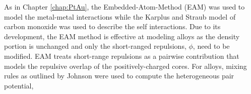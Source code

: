 %
%
As in Chapter \ref{chap:PtAu}, the Embedded-Atom-Method (EAM) was used to model
the metal-metal interactions while the Karplus and Straub model of carbon
monoxide was used to describe the  self interactions. Due to its development, the EAM
method is effective at modeling alloys as the density portion is unchanged
and only the short-ranged repulsions, $\phi$, need to be modified. EAM treats
short-range repulsions as a pairwise contribution that models the repulsive
overlap of the positively-charged cores. For alloys, mixing rules as outlined
by Johnson \citep{Johnson:1989yr} were used to compute the heterogeneous pair
potential,

